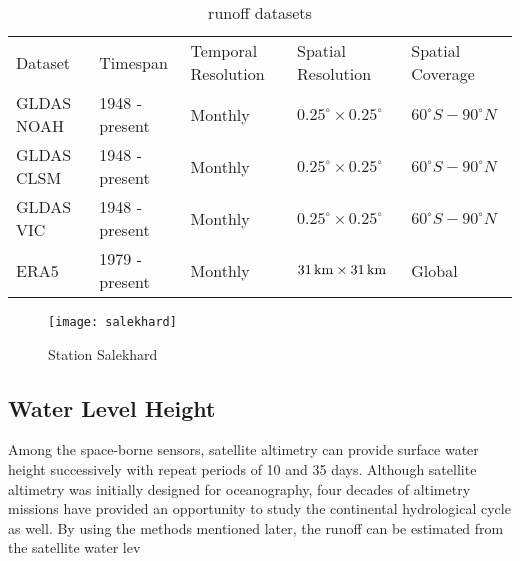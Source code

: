 \begin{table}[htbp]\centering
	\begin{tabular}{lllll}
		&                                     &                                          &                                         &                                       \\ \hline
		\multicolumn{1}{|l|}{Dataset}    & \multicolumn{1}{l|}{Timespan}       & \multicolumn{1}{l|}{Temporal Resolution} & \multicolumn{1}{l|}{Spatial Resolution} & \multicolumn{1}{l|}{Spatial Coverage} \\ \hline
		\multicolumn{1}{|l|}{GLDAS NOAH} & \multicolumn{1}{l|}{1948 - present} & \multicolumn{1}{l|}{Monthly}             & \multicolumn{1}{l|}{$0.25^{\circ} \times  0.25^{\circ}$}        & \multicolumn{1}{l|}{$60^{\circ}S - 90^{\circ}N$}      \\ \hline
		\multicolumn{1}{|l|}{GLDAS CLSM} & \multicolumn{1}{l|}{1948 - present} & \multicolumn{1}{l|}{Monthly}             & \multicolumn{1}{l|}{$0.25^{\circ} \times 0.25^{\circ}$}        & \multicolumn{1}{l|}{$60^{\circ}S - 90^{\circ}N$}      \\ \hline
		\multicolumn{1}{|l|}{GLDAS VIC}  & \multicolumn{1}{l|}{1948 - present} & \multicolumn{1}{l|}{Monthly}             & \multicolumn{1}{l|}{$0.25^{\circ} \times 0.25^{\circ}$}        & \multicolumn{1}{l|}{$60^{\circ}S - 90^{\circ}N$}      \\   \hline
		\multicolumn{1}{|l|}{ERA5}       & \multicolumn{1}{l|}{1979 - present} & \multicolumn{1}{l|}{Monthly}             & \multicolumn{1}{l|}{$31\,\mathrm{km} \times 31\,\mathrm{km}$}            & \multicolumn{1}{l|}{Global}           \\ \hline
	\end{tabular}
	\caption{runoff datasets}
	\label{tab:runoff}
\end{table}
\begin{figure}[htbp]
	\centering
	\texttt{[image: salekhard]} %
	\caption{Station Salekhard} 
	\label{fig:Salekhard}
\end{figure}
\subsection{Water Level Height}
 Among the space-borne sensors, satellite altimetry can provide surface water height successively with repeat periods of 10 and 35 days. Although satellite altimetry was initially designed for oceanography, four decades of altimetry missions have provided an opportunity to study the continental hydrological cycle as well. By using the methods mentioned later, the runoff can be estimated from the satellite water lev
